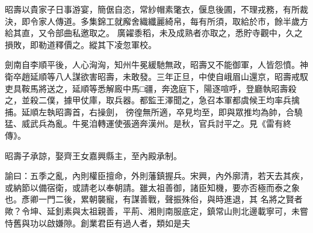\begin{pinyinscope}
 昭壽以貴家子日事游宴，簡倨自恣，常紗帽素氅衣，偃息後圃，不理戎務，有所裁決，即令家人傳道。多集錦工就廨舍織纖麗綺帛，每有所須，取給於市，餘半歲方給其直，又令部曲私邀取之。
 廣糴黍稻，未及成熟者亦取之，悉貯寺觀中，久之損敗，即勒道釋價之。縱其下凌忽軍校。



 劍南自李順平後，人心洶洶，知州牛冕緩馳無政，昭壽又不能御軍，人皆怨憤。神衛卒趙延順等八人謀欲害昭壽，未敢發。三年正旦，中使自峨眉山還京，昭壽戒馭吏具鞍馬將送之，延順等悉解廄中馬□疆，奔逸庭下，陽逐喧呼，登廳執昭壽殺之，並殺二僕，據甲仗庫，取兵器。都監王澤聞之，急召本軍都虞候王均率兵擒捕。延順左執昭壽首，右操劍，
 徬徨無所適，卒見均至，即與眾推均為帥，合驍猛、威武兵為亂。牛冕洎轉運使張適奔漢州。是秋，官兵討平之。見《雷有終傳》。



 昭壽子承諒，娶齊王女嘉興縣主，至內殿承制。



 諭曰：五季之亂，內則權臣擅命，外則藩鎮握兵。宋興，內外廓清，若天去其疾，或納節以備宿衛，或請老以奉朝請。雖太祖善御，諸臣知機，要亦否極而泰之象也。彥卿一門二後，累朝襲寵，有謀善戰，聲振殊俗，與時進退，其
 名將之賢者歟？令坤、延釗素與太祖親善，平荊、湘則南服底定，鎮常山則北邊載寧可，未嘗恃舊與功以啟嫌隙。創業君臣有過人者，類如是夫



\end{pinyinscope}